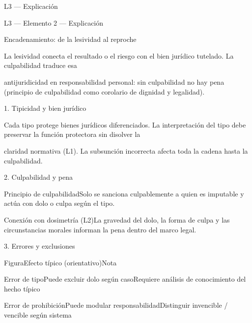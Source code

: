 \documentclass[11pt,a4paper]{article}
\begin{document}
L3 — Explicación\par





    L3 — Elemento 2 — Explicación\par
    Encadenamiento: de la lesividad al reproche\par


      La lesividad conecta el resultado o el riesgo con el bien jurídico tutelado. La culpabilidad traduce esa\par
      antijuridicidad en responsabilidad personal: sin culpabilidad no hay pena (principio de culpabilidad como corolario de dignidad y legalidad).\par



      1. Tipicidad y bien jurídico\par


        Cada tipo protege bienes jurídicos diferenciados. La interpretación del tipo debe preservar la función protectora sin disolver la\par
        claridad normativa (L1). La subsunción incorrecta afecta toda la cadena hasta la culpabilidad.\par





      2. Culpabilidad y pena\par


        Principio de culpabilidadSolo se sanciona culpablemente a quien es imputable y actúa con dolo o culpa según el tipo.\par

        Conexión con dosimetría (L2)La gravedad del dolo, la forma de culpa y las circunstancias morales informan la pena dentro del marco legal.\par






      3. Errores y exclusiones\par



          FiguraEfecto típico (orientativo)Nota\par




          Error de tipoPuede excluir dolo según casoRequiere análisis de conocimiento del hecho típico\par

          Error de prohibiciónPuede modular responsabilidadDistinguir invencible / vencible según sistema\par
\end{document}
